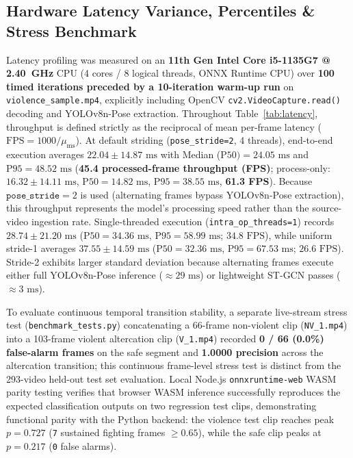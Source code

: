 \documentclass[conference]{IEEEtran}
\begin{document}
\subsection{Hardware Latency Variance, Percentiles \& Stress Benchmark}
Latency profiling was measured on an \textbf{11th Gen Intel Core i5-1135G7 @ 2.40~GHz} CPU (4 cores / 8 logical threads, ONNX Runtime CPU) over \textbf{100 timed iterations preceded by a 10-iteration warm-up run} on \texttt{violence\_sample.mp4}, explicitly including OpenCV \texttt{cv2.VideoCapture.read()} decoding and \mbox{YOLOv8n-Pose} extraction. Throughout Table~\ref{tab:latency}, throughput is defined strictly as the reciprocal of mean per-frame latency ($\text{FPS} = 1000 / \mu_{\text{ms}}$). At default striding (\texttt{pose\_stride=2}, 4 threads), end-to-end execution averages $22.04 \pm 14.87\text{ ms}$ with Median ($\text{P50}) = 24.05\text{ ms}$ and $\text{P95} = 48.52\text{ ms}$ (\textbf{45.4 processed-frame throughput (FPS)}; process-only: $16.32 \pm 14.11\text{ ms}$, $\text{P50}=14.82\text{ ms}$, $\text{P95}=38.55\text{ ms}$, \textbf{61.3 FPS}). Because $\texttt{pose\_stride}=2$ is used (alternating frames bypass YOLOv8n-Pose extraction), this throughput represents the model's processing speed rather than the source-video ingestion rate. Single-threaded execution (\texttt{intra\_op\_threads=1}) records $28.74 \pm 21.20\text{ ms}$ ($\text{P50}=34.36\text{ ms}$, $\text{P95}=58.99\text{ ms}$; $34.8\text{ FPS}$), while uniform stride-1 averages $37.55 \pm 14.59\text{ ms}$ ($\text{P50}=32.36\text{ ms}$, $\text{P95}=67.53\text{ ms}$; $26.6\text{ FPS}$). Stride-2 exhibits larger standard deviation because alternating frames execute either full \mbox{YOLOv8n-Pose} inference ($\approx 29\text{ ms}$) or lightweight ST-GCN passes ($\approx 3\text{ ms}$).

To evaluate continuous temporal transition stability, a separate live-stream stress test (\texttt{benchmark\_tests.py}) concatenating a 66-frame non-violent clip (\texttt{NV\_1.mp4}) into a 103-frame violent altercation clip (\texttt{V\_1.mp4}) recorded \textbf{0 / 66 (0.0\%) false-alarm frames} on the safe segment and \textbf{1.0000 precision} across the altercation transition; this continuous frame-level stress test is distinct from the 293-video held-out test set evaluation. Local Node.js \texttt{onnxruntime-web} WASM parity testing verifies that browser WASM inference successfully reproduces the expected classification outputs on two regression test clips, demonstrating functional parity with the Python backend: the violence test clip reaches peak $p = 0.727$ (\texttt{7} sustained fighting frames $\ge 0.65$), while the safe clip peaks at $p = 0.217$ (\texttt{0} false alarms).
\end{document}
